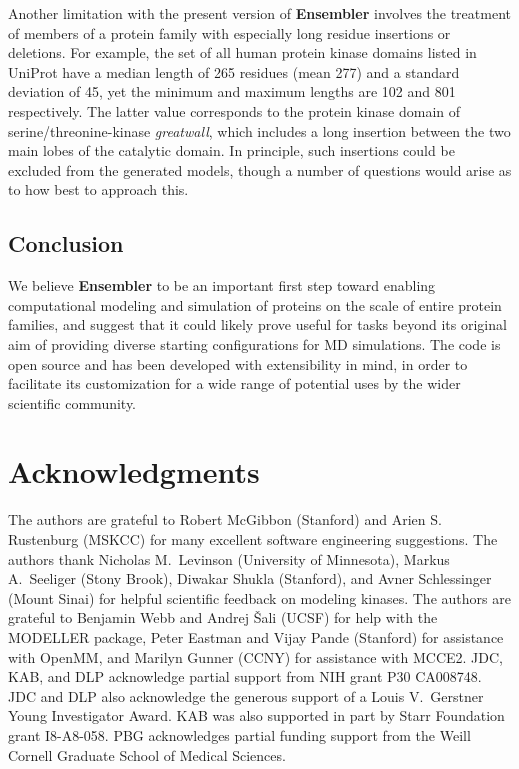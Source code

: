 \documentclass[aps,pre,twocolumn,nofootinbib,superscriptaddress,linenumbers]{revtex4-1}
\begin{document}
Another limitation with the present version of {\bf Ensembler} involves the treatment of members of a protein family with especially long residue insertions or deletions.
For example, the set of all human protein kinase domains listed in UniProt have a median length of 265 residues (mean 277) and a standard deviation of 45, yet the minimum and maximum lengths are 102 and 801 respectively.
The latter value corresponds to the protein kinase domain of serine/threonine-kinase \emph{greatwall}, which includes a long insertion between the two main lobes of the catalytic domain.
In principle, such insertions could be excluded from the generated models, though a number of questions would arise as to how best to approach this.

\subsection*{Conclusion}

We believe {\bf Ensembler} to be an important first step toward enabling computational modeling and simulation of proteins on the scale of entire protein families, and suggest that it could likely prove useful for tasks beyond its original aim of providing diverse starting configurations for MD simulations.
The code is open source and has been developed with extensibility in mind, in order to facilitate its customization for a wide range of potential uses by the wider scientific community.



\section{Acknowledgments}
\label{section:acknowledgments}

The authors are grateful to Robert McGibbon (Stanford) and Arien S. Rustenburg (MSKCC) for many excellent software engineering suggestions.
The authors thank Nicholas M.~Levinson (University of Minnesota), Markus A.~Seeliger (Stony Brook), Diwakar Shukla (Stanford), and Avner Schlessinger (Mount Sinai) for helpful scientific feedback on modeling kinases.
The authors are grateful to Benjamin Webb and Andrej \v{S}ali (UCSF) for help with the MODELLER package, Peter Eastman and Vijay Pande (Stanford) for assistance with OpenMM, and Marilyn Gunner (CCNY) for assistance with MCCE2.
JDC, KAB, and DLP acknowledge partial support from NIH grant P30 CA008748.
JDC and DLP also acknowledge the generous support of a Louis V.~Gerstner Young Investigator Award.
KAB was also supported in part by Starr Foundation grant I8-A8-058.
PBG acknowledges partial funding support from the Weill Cornell Graduate School of Medical Sciences.
\end{document}
